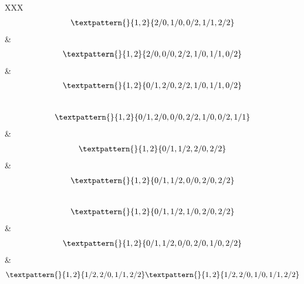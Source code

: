 \begin{center}
\begin{longtabu}[l]{XXX}
\begin{equation}
	\begin{gathered}
		\textpattern{}{1,2}{2/0,1/0,0/2,1/1,2/2}
	\end{gathered}
	\label{cls:125}
\end{equation}
&
\begin{equation}
	\begin{gathered}
		\textpattern{}{1,2}{2/0,0/0,2/2,1/0,1/1,0/2}
	\end{gathered}
	\label{cls:126}
\end{equation}
&
\begin{equation}
	\begin{gathered}
		\textpattern{}{1,2}{0/1,2/0,2/2,1/0,1/1,0/2}
	\end{gathered}
	\label{cls:127}
\end{equation}
\\
\begin{equation}
	\begin{gathered}
		\textpattern{}{1,2}{0/1,2/0,0/0,2/2,1/0,0/2,1/1}
	\end{gathered}
	\label{cls:128}
\end{equation}
&
\begin{equation}
	\begin{gathered}
		\textpattern{}{1,2}{0/1,1/2,2/0,2/2}
	\end{gathered}
	\label{cls:129}
\end{equation}
&
\begin{equation}
	\begin{gathered}
		\textpattern{}{1,2}{0/1,1/2,0/0,2/0,2/2}
	\end{gathered}
	\label{cls:130}
\end{equation}
\\
\begin{equation}
	\begin{gathered}
		\textpattern{}{1,2}{0/1,1/2,1/0,2/0,2/2}
	\end{gathered}
	\label{cls:131}
\end{equation}
&
\begin{equation}
	\begin{gathered}
		\textpattern{}{1,2}{0/1,1/2,0/0,2/0,1/0,2/2}
	\end{gathered}
	\label{cls:132}
\end{equation}
&
\begin{equation}
	\begin{gathered}
		\textpattern{}{1,2}{1/2,2/0,1/1,2/2}
		\textpattern{}{1,2}{1/2,2/0,1/0,1/1,2/2}
	\end{gathered}
	\label{cls:133}

\end{equation}
\end{longtabu}
\end{center}
